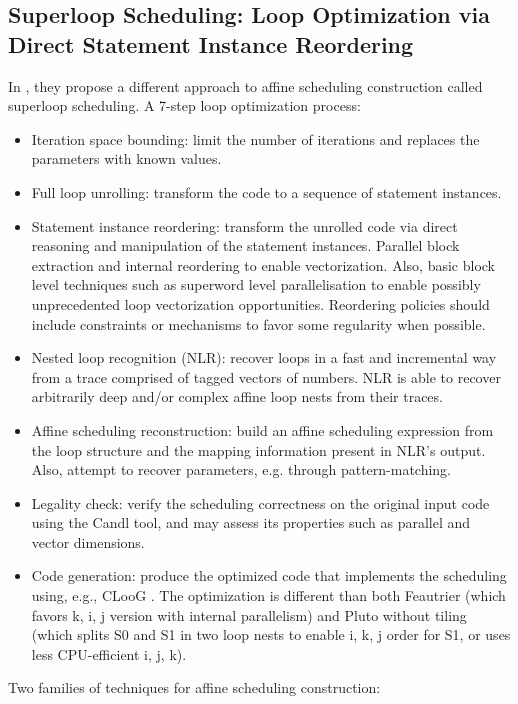 \subsection{Superloop Scheduling: Loop Optimization via Direct Statement Instance Reordering}
In \cite{bastoul2023superloop}, they propose a different approach to affine scheduling construction called superloop scheduling. A 7-step loop optimization process:
\begin{itemize}
    \item Iteration space bounding: limit the number of iterations and replaces the parameters with known values.
    \item Full loop unrolling: transform the code to a sequence of statement instances.
    \item Statement instance reordering: transform the unrolled code via direct reasoning and manipulation of the statement instances. Parallel block extraction and internal reordering to enable vectorization. Also, basic block level techniques such as superword level parallelisation \cite{Mendis_2018} to enable possibly unprecedented loop vectorization opportunities. Reordering policies should include constraints or mechanisms to favor some regularity when possible.
    \item Nested loop recognition (NLR): recover loops in a fast and incremental way \cite{ketterlin2008prediction} from a trace comprised of tagged vectors of numbers. NLR is able to recover arbitrarily deep and/or complex affine loop nests from their traces.
    \item Affine scheduling reconstruction: build an affine scheduling expression from the loop structure and the mapping information present in NLR’s output. Also, attempt to recover parameters, e.g. through pattern-matching.
    \item Legality check: verify the scheduling correctness on the original input code using the Candl tool, and may assess its properties such as parallel and vector dimensions.
    \item Code generation: produce the optimized code that implements the scheduling using, e.g., CLooG \cite{bastoul2004code}. The optimization is different than both Feautrier \cite{feautrier1992some} (which favors k, i, j version with internal parallelism) and Pluto without tiling \cite{bondhugula2008practical} (which splits S0 and S1 in two loop nests to enable i, k, j order for S1, or uses less CPU-efficient i, j, k).
\end{itemize}
Two families of techniques for affine scheduling construction:

